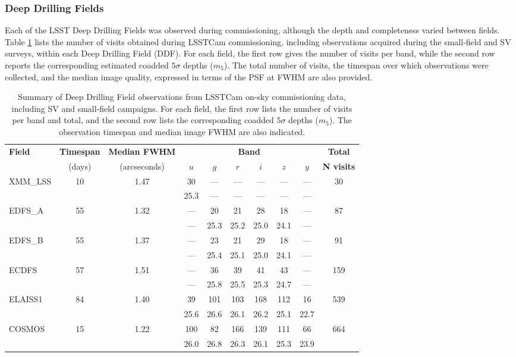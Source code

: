 \subsubsection{Deep Drilling Fields}
Each of the LSST Deep Drilling Fields was observed during commissioning, although the depth and completeness  varied between fields.
Table \ref{tab:sv_ddf_summary}  lists the number of visits obtained during LSSTCam commissioning, including observations acquired during the  small-field  and SV surveys, within each Deep Drilling Field (DDF).
For each field, the first row gives the number of visits per band, while the second row reports the corresponding estimated coadded $5\sigma$ depths ($m_5$).
The total number of visits, the timespan over which observations were collected, and the median image quality, expressed in terms of the PSF at FWHM are also provided.
\begin{table}[htb]
\centering
\renewcommand{\arraystretch}{1.2}
\begin{tabular}{lccccccccc}
\toprule
\textbf{Field} &
\textbf{Timespan} &
\textbf{Median FWHM} &
\multicolumn{6}{c}{\textbf{Band}} &
\textbf{Total} \\
\cmidrule(lr){4-9}
 & (days) & (arcseconds) & $u$ & $g$ & $r$ & $i$ & $z$ & $y$ & \textbf{N visits} \\
\midrule
XMM\_LSS  & 10 & 1.47 & 30 & — & — & — & — & — & 30 \\
           &    &      & 25.3 & — & — & — & — & — &  \\
\addlinespace
EDFS\_A   & 55 & 1.32 & — & 20 & 21 & 28 & 18 & — & 87 \\
           &    &      & — & 25.3 & 25.2 & 25.0 & 24.1 & — &  \\
\addlinespace
EDFS\_B   & 55 & 1.37 & — & 23 & 21 & 29 & 18 & — & 91 \\
           &    &      & — & 25.4 & 25.1 & 25.0 & 24.1 & — &  \\
\addlinespace
ECDFS     & 57 & 1.51 & — & 36 & 39 & 41 & 43 & — & 159 \\
                 &      &         & — & 25.8 & 25.5 & 25.3 & 24.7 & — &  \\
\addlinespace
ELAISS1   & 84 & 1.40 & 39    & 101 & 103 & 168 & 112 & 16 & 539 \\
                 &       &         & 25.6 & 26.6&  26.1 &  26.2 &  25.1 & 22.7 & \\
\addlinespace
COSMOS    & 15 & 1.22 & 100 & 82 & 166 & 139 & 111 & 66 & 664 \\
                    &      &        & 26.0 & 26.8 & 26.3 & 26.1 & 25.3 & 23.9 &  \\
\bottomrule

\end{tabular}
\caption{Summary of Deep Drilling Field observations from LSSTCam on-sky commissioning data, including SV and small-field campaigns. For each field, the first row lists the number of visits per band and total, and the second row lists the corresponding coadded $5\sigma$ depths ($m_5$). The observation timespan and median image FWHM are also indicated.}
\label{tab:sv_ddf_summary}
\end{table}

